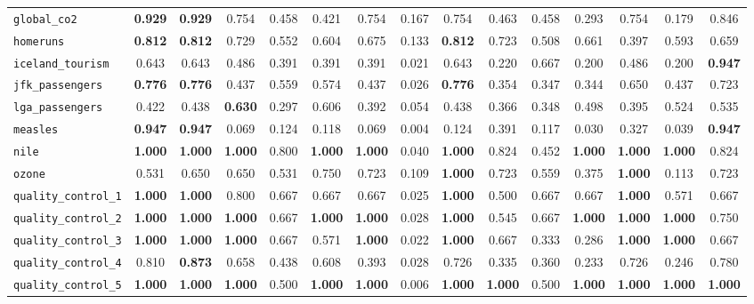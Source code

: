 \begin{tabular}{lcccccccccccccc}
\verb+global_co2+ & \textbf{0.929} & \textbf{0.929} & 0.754 & 0.458 & 0.421 & 0.754 & 0.167 & 0.754 & 0.463 & 0.458 & 0.293 & 0.754 & 0.179 & 0.846\\
\verb+homeruns+ & \textbf{0.812} & \textbf{0.812} & 0.729 & 0.552 & 0.604 & 0.675 & 0.133 & \textbf{0.812} & 0.723 & 0.508 & 0.661 & 0.397 & 0.593 & 0.659\\
\verb+iceland_tourism+ & 0.643 & 0.643 & 0.486 & 0.391 & 0.391 & 0.391 & 0.021 & 0.643 & 0.220 & 0.667 & 0.200 & 0.486 & 0.200 & \textbf{0.947}\\
\verb+jfk_passengers+ & \textbf{0.776} & \textbf{0.776} & 0.437 & 0.559 & 0.574 & 0.437 & 0.026 & \textbf{0.776} & 0.354 & 0.347 & 0.344 & 0.650 & 0.437 & 0.723\\
\verb+lga_passengers+ & 0.422 & 0.438 & \textbf{0.630} & 0.297 & 0.606 & 0.392 & 0.054 & 0.438 & 0.366 & 0.348 & 0.498 & 0.395 & 0.524 & 0.535\\
\verb+measles+ & \textbf{0.947} & \textbf{0.947} & 0.069 & 0.124 & 0.118 & 0.069 & 0.004 & 0.124 & 0.391 & 0.117 & 0.030 & 0.327 & 0.039 & \textbf{0.947}\\
\verb+nile+ & \textbf{1.000} & \textbf{1.000} & \textbf{1.000} & 0.800 & \textbf{1.000} & \textbf{1.000} & 0.040 & \textbf{1.000} & 0.824 & 0.452 & \textbf{1.000} & \textbf{1.000} & \textbf{1.000} & 0.824\\
\verb+ozone+ & 0.531 & 0.650 & 0.650 & 0.531 & 0.750 & 0.723 & 0.109 & \textbf{1.000} & 0.723 & 0.559 & 0.375 & \textbf{1.000} & 0.113 & 0.723\\
\verb+quality_control_1+ & \textbf{1.000} & \textbf{1.000} & 0.800 & 0.667 & 0.667 & 0.667 & 0.025 & \textbf{1.000} & 0.500 & 0.667 & 0.667 & \textbf{1.000} & 0.571 & 0.667\\
\verb+quality_control_2+ & \textbf{1.000} & \textbf{1.000} & \textbf{1.000} & 0.667 & \textbf{1.000} & \textbf{1.000} & 0.028 & \textbf{1.000} & 0.545 & 0.667 & \textbf{1.000} & \textbf{1.000} & \textbf{1.000} & 0.750\\
\verb+quality_control_3+ & \textbf{1.000} & \textbf{1.000} & \textbf{1.000} & 0.667 & 0.571 & \textbf{1.000} & 0.022 & \textbf{1.000} & 0.667 & 0.333 & 0.286 & \textbf{1.000} & \textbf{1.000} & 0.667\\
\verb+quality_control_4+ & 0.810 & \textbf{0.873} & 0.658 & 0.438 & 0.608 & 0.393 & 0.028 & 0.726 & 0.335 & 0.360 & 0.233 & 0.726 & 0.246 & 0.780\\
\verb+quality_control_5+ & \textbf{1.000} & \textbf{1.000} & \textbf{1.000} & 0.500 & \textbf{1.000} & \textbf{1.000} & 0.006 & \textbf{1.000} & \textbf{1.000} & 0.500 & \textbf{1.000} & \textbf{1.000} & \textbf{1.000} & \textbf{1.000}\\

\end{tabular}

